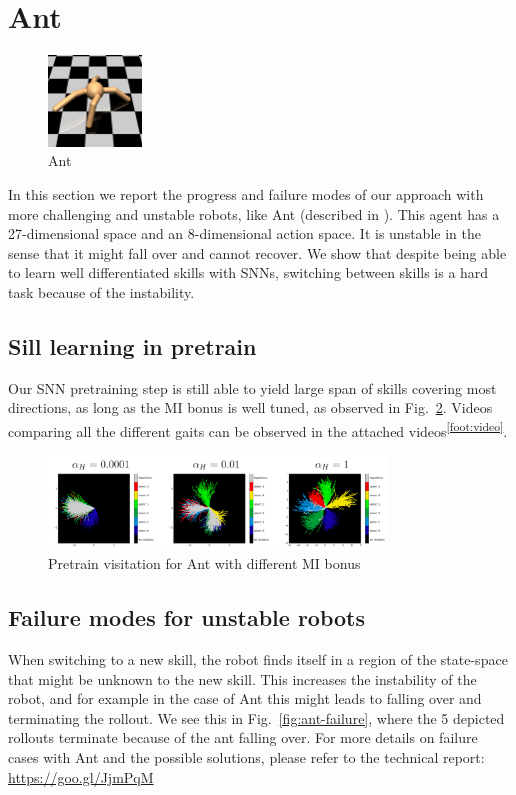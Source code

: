 \documentclass{article} %
\begin{document}
\section{Ant}
\label{sec:ant}
\begin{figure}
\vspace{-40pt}
\includegraphics[trim={0cm 2cm 1cm 2.5cm}, clip, width = 2.5cm]{Figures/ant.png}
\vspace{-20pt}
\caption{Ant}
\label{fig:ant}
\end{figure}

In this section we report the progress and failure modes of our approach with more challenging and unstable robots, like Ant (described in \cite{duan2016benchmarking}). This agent has a 27-dimensional space and an 8-dimensional action space. It is unstable in the sense that it might fall over and cannot recover. We show that despite being able to learn well differentiated skills with SNNs, switching between skills is a hard task because of the instability.

\subsection{Sill learning in pretrain}
Our SNN pretraining step is still able to yield large span of skills covering most directions, as long as the MI bonus is well tuned, as observed in Fig.\ \ref{fig:ant-pretrain}. Videos comparing all the different gaits can be observed in the attached videos\textsuperscript{\ref{foot:video}}.

\begin{figure}[h]
    \centering
    \includegraphics[width = 0.8\textwidth]{Figures/ant-pretrain-visitation.png}
    \caption{Pretrain visitation for Ant with different MI bonus}
    \label{fig:ant-pretrain}
\end{figure}

\subsection{Failure modes for unstable robots}
\label{sec:ant-failure}
When switching to a new skill, the robot finds itself in a region of the state-space that might be unknown to the new skill. This increases the instability of the robot, and for example in the case of Ant this might leads to falling over and terminating the rollout. We see this in Fig.\ \ref{fig:ant-failure}, where the 5 depicted rollouts terminate because of the ant falling over. For more details on failure cases with Ant and the possible solutions, please refer to the technical report: \url{https://goo.gl/JjmPqM}
\end{document}
